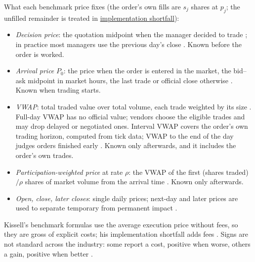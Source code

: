 \begin{qfdefinition}
 What each benchmark price fixes (the order's own fills are $s_j$ shares at $p_j$; the unfilled remainder is treated in \hyperref[def:implementation-shortfall]{implementation shortfall}):
\begin{itemize}
\item \emph{Decision price}: the quotation midpoint when the manager decided to trade \citep[chap.~``Liquidity and Transaction Cost Measurement'', p.~426]{alpha-harris}; in practice most managers use the previous day's close \citep[same chap., box ``The Plexus Iceberg of Transaction Costs'', p.~437]{alpha-harris}. Known before the order is worked.
\item \emph{Arrival price} $P_0$: the price when the order is entered in the market, the bid--ask midpoint in market hours, the last trade or official close otherwise \citep[chap.~3, p.~102]{s7-kissellscience}. Known when trading starts.
\item \emph{VWAP}: total traded value over total volume, each trade weighted by its size \citep[chap.~``Liquidity and Transaction Cost Measurement'', p.~425]{alpha-harris}. Full-day VWAP has no official value; vendors choose the eligible trades and may drop delayed or negotiated ones. Interval VWAP covers the order's own trading horizon, computed from tick data; VWAP to the end of the day judges orders finished early \citep[chap.~3, pp.~107--108]{s7-kissellscience}. Known only afterwards, and it includes the order's own trades.
\item \emph{Participation-weighted price} at rate $\rho$: the VWAP of the first (shares traded)$/\rho$ shares of market volume from the arrival time \citep[chap.~3, eqs.~(3.15)--(3.16), p.~108]{s7-kissellscience}. Known only afterwards.
\item \emph{Open, close, later closes}: single daily prices; next-day and later prices are used to separate temporary from permanent impact \citep[chap.~3, p.~106]{s7-kissellscience}.
\end{itemize}
Kissell's benchmark formulas use the average execution price without fees, so they are gross of explicit costs; his implementation shortfall adds fees \citep[chap.~3, eqs.~(3.4)--(3.16), pp.~98--108]{s7-kissellscience}. Signs are not standard across the industry: some report a cost, positive when worse, others a gain, positive when better \citep[chap.~3, pp.~97 and~108]{s7-kissellscience}.


\end{qfdefinition}
